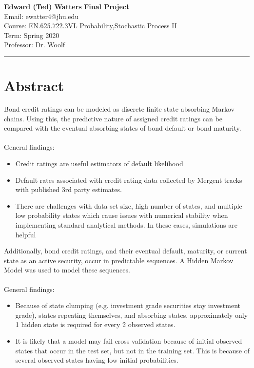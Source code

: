 \documentclass[a4paper, 11pt]{article}
\begin{document}
\noindent
\large\textbf{Edward (Ted) Watters} \hfill \textbf{Final Project}   \\
Email: ewatter4@jhu.edu  \\
\normalsize Course: EN.625.722.3VL Probability,Stochastic Process II\\
Term: Spring 2020\\
Professor: Dr. Woolf \\
\noindent\rule{7in}{2.8pt}
\section{Abstract}
Bond credit ratings can be modeled as discrete finite state absorbing Markov chains. Using this, the predictive nature of assigned credit ratings can be compared with the eventual absorbing states of bond default or bond maturity.\\
\\
General findings:
\begin{itemize}
	\item Credit ratings are useful estimators of default likelihood
	\item Default rates associated with credit rating data collected by Mergent tracks with published 3rd party estimates.
	\item There are challenges with data set size, high number of states, and multiple low probability states which cause issues with numerical stability when implementing standard analytical methods. In these cases, simulations are helpful
\end{itemize}

Additionally, bond credit ratings, and their eventual default, maturity, or current state as an active security, occur in predictable sequences. A Hidden Markov Model was used to model these sequences. \\
\\
General findings:
\begin{itemize}
	\item Because of state clumping (e.g. investment grade securities stay investment grade), states repeating themselves, and absorbing states, approximately only 1 hidden state is required for every 2 observed states.
	\item It is likely that a model may fail cross validation because of initial observed states that occur in the test set, but not in the training set. This is because of several observed states having low initial probabilities.
\end{itemize}
\end{document}
